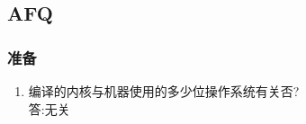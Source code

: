 \subsection{AFQ}
\subsubsection{准备}
\begin{enumerate}
\item 编译的内核与机器使用的多少位操作系统有关否?\\
答:无关

\end{enumerate}

\clearpage